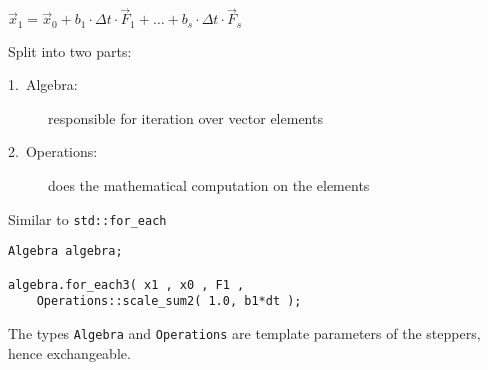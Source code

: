 
\begin{frame}[fragile]

\centerline{$\vec x_1 = \vec x_0 + b_1\cdot \Delta t \cdot \vec F_1 + \dots + b_s\cdot \Delta t \cdot \vec F_s$}

\vspace{0.5em}

Split into two parts:

\begin{description}
 \item[1.~Algebra:] responsible for iteration over vector elements
 \item[2.~Operations:] does the mathematical computation on the elements
\end{description}

\vspace{0.5em}

Similar to \lstinline+std::for_each+

\begin{lstlisting}
Algebra algebra;

algebra.for_each3( x1 , x0 , F1 ,
    Operations::scale_sum2( 1.0, b1*dt );
\end{lstlisting}
\pause

The types \lstinline+Algebra+ and \lstinline+Operations+ are template parameters of the steppers, hence exchangeable.
\end{frame}


